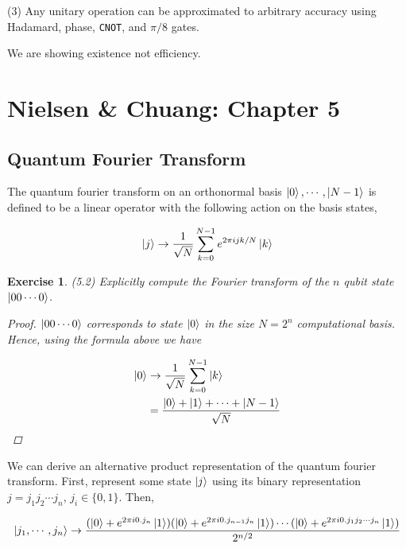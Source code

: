 \documentclass[11pt]{article}
\newcommand\0{\mathbf{0}}
\newcommand\<{\langle}
\renewcommand\>{\rangle}
\newtheorem{exercise}[theorem]{Exercise}
\begin{document}
(3) Any unitary operation can be approximated to arbitrary accuracy using Hadamard, phase, \texttt{CNOT}, and $\pi / 8$ gates.

We are showing existence not efficiency.

\section{Nielsen \& Chuang: Chapter 5}

\subsection{Quantum Fourier Transform}

The quantum fourier transform on an orthonormal basis $\ket{0}, \cdots ,\ket{N - 1}$ is defined to be a linear operator with the following action on the basis states,

\begin{align*}
\ket{j} \rightarrow \frac{1}{\sqrt{N}} \sum_{k=0}^{N-1} e^{2\pi i jk / N} \ket{k}	
\end{align*}


\begin{exercise}(5.2) Explicitly compute the Fourier transform of the $n$ qubit state $\ket{00\cdots 0}$.
\begin{proof}
	$\ket{00 \cdots 0 }$ corresponds to state $\ket{0}$ in the size $N = 2^n$ computational basis. Hence, using the formula above we have 
	
	\begin{align*}
	\ket{0} &\rightarrow \frac{1}{\sqrt{N}} \sum_{k=0}^{N-1} \ket{k} \\
	&= 	\frac{\ket{0} + \ket{1} + \cdots + \ket{N-1}}{\sqrt{N}}
	\end{align*}

\end{proof}
	
\end{exercise}

We can derive an alternative product representation of the quantum fourier transform. First, represent some state $\ket{j}$ using its binary representation $j=j_1j_2 \cdots j_n$, $j_i \in \{0, 1\}$. Then,

\begin{align*}
\ket{j_1 , \cdots , j_n } \rightarrow \frac{(\ket{0} + e^{2\pi i 0.j_n} \ket{1})(\ket{0} + e^{2\pi i 0.j_{n-1}j_n} \ket{1})\cdots (\ket{0} + e^{2\pi i 0.j_1j_2 \cdots j_n} \ket{1})}{2^{n/2}}
\end{align*}
\end{document}

